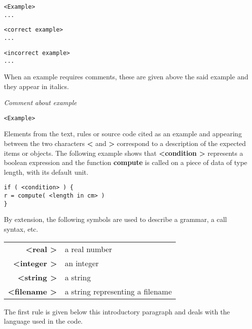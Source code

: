 \lstset{language=C++, basicstyle=\normalsize}
\begin{lstlisting}[frame=TRL]
<Example>
...
\end{lstlisting}
\begin{lstlisting}[frame=RL]
<correct example>
...
\end{lstlisting}

\begin{lstlisting}[frame=RLB]
<incorrect example>
...
\end{lstlisting}

When an example requires comments, these are given above the said example and they appear in italics.

\emph{Comment about example}
\lstset{language=C++, basicstyle=\normalsize}
\begin{lstlisting}[frame=TRBL]
<Example>
\end{lstlisting}

Elements from the text, rules or source code cited as an example and appearing between the two characters {\bf \textless} and {\bf \textgreater} correspond to a description of the expected items or objects. The following example shows that {\bf \textless condition \textgreater} represents a boolean expression and the function {\bf compute} is called on a piece of data of type length, with its default unit.

\begin{lstlisting}[frame=TRBL]
if ( <condition> ) {
r = compute( <length in cm> )
}
\end{lstlisting}

By extension, the following symbols are used to describe a grammar, a call syntax, etc.

\begin{tabular}{rl}
{\bf \textless real \textgreater} & a real number \\
{\bf \textless integer \textgreater} & an integer \\
{\bf \textless string \textgreater} & a string \\
{\bf \textless filename \textgreater} & a string representing a filename
\end{tabular}

The first rule is given below this introductory paragraph and deals with the language used in the code.
